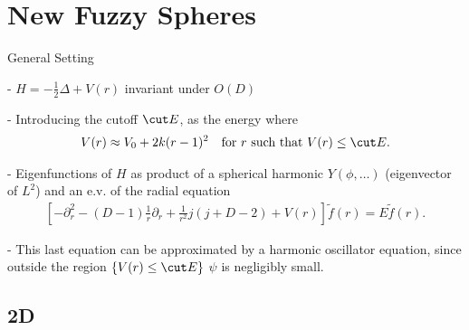 \section{New Fuzzy Spheres}

\begin{frame}{General Setting} %
    
    - $H = - \frac{1}{2} \Delta + V(r)$ invariant under $O(D)$
    
    - Introducing the cutoff $\cut E$, as the energy where
    \begin{align}
        \label{eqn5}
            V(r) \approx V_0 + 2k(r-1)^2 && \text{for $r$ such that $V(r) \leq  \cut E$}.
    \end{align}
    
    - Eigenfunctions of $H$ as product of a spherical harmonic $Y(\phi, \dots)$ (eigenvector of $L^2$) and an e.v. of the radial equation 
    \begin{align}
        \label{eqn9}
        \left[-\partial_r^2 - (D-1) \frac{1}{r} \partial_r + \frac{1}{r^2} j(j+D-2) + V(r)\right] \tilde f(r) = E \tilde f(r).
    \end{align}
    
    - This last equation can be approximated by a harmonic oscillator equation, since outside the region $\{V(r) \leq \cut E\}$ $\psi$ is negligibly small.
        
    
    
    
    
\end{frame}

\subsection{2D}


